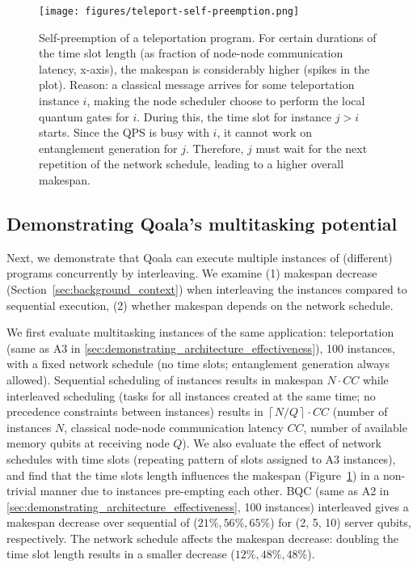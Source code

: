 \begin{figure}%
    \centering
    \texttt{[image: figures/teleport-self-preemption.png]}
    \caption{Self-preemption of a teleportation program.
    For certain durations of the time slot length (as fraction of node-node communication latency, x-axis), the makespan is considerably higher (spikes in the plot).
    Reason: a classical message arrives for some teleportation instance $i$,
    making the node scheduler choose to perform the local quantum gates for $i$. During this,
    the time slot for instance $j > i$ starts. Since the QPS is busy with $i$, it cannot work on entanglement
    generation for $j$. Therefore, $j$ must wait for the next repetition of the network schedule, leading to a higher overall makespan.
    }
    \label{fig:teleport_self_preemption}
\end{figure}

\subsection{Demonstrating Qoala's multitasking potential}
Next, we demonstrate that Qoala can execute multiple instances of (different) programs concurrently by interleaving. We examine (1) makespan decrease (Section~\ref{sec:background_context}) when interleaving the instances compared to sequential execution, %
(2) whether makespan depends on the network schedule.

We first evaluate multitasking instances of the same application: teleportation (same as A3 in \ref{sec:demonstrating_architecture_effectiveness}), 100 instances, with a fixed network schedule (no time slots; entanglement generation always allowed).
Sequential scheduling of instances results in makespan $N \cdot CC$
while interleaved scheduling (tasks for all instances created at the same time; no precedence constraints between instances) results in $\left\lceil N / Q \right\rceil \cdot CC$
(number of instances $N$, classical node-node communication latency $CC$, number of available memory qubits at receiving node $Q$).
We also evaluate the effect of network schedules with time slots (repeating pattern of slots assigned to A3 instances), and find that the time slots length influences the makespan (Figure~\ref{fig:teleport_self_preemption}) in a non-trivial manner due to instances pre-empting each other.
BQC (same as A2 in \ref{sec:demonstrating_architecture_effectiveness}, 100 instances) interleaved gives a makespan decrease over sequential of ($21\%, 56\%, 65\%$) for (2, 5, 10) server qubits, respectively.
The network schedule affects the makespan decrease: doubling the time slot length results in a smaller decrease ($12\%, 48\%, 48\%$). 

